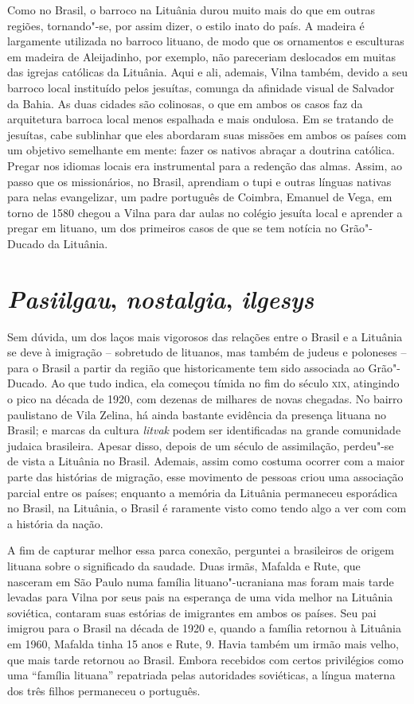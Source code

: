 Como no Brasil, o barroco na Lituânia durou muito mais do que em outras
regiões, tornando"-se, por assim dizer, o estilo inato do país. A madeira
é largamente utilizada no barroco lituano, de modo que os ornamentos e
esculturas em madeira de Aleijadinho, por exemplo, não pareceriam
deslocados em muitas das igrejas católicas da Lituânia. Aqui e ali,
ademais, Vilna também, devido a seu barroco local instituído pelos
jesuítas, comunga da afinidade visual de Salvador da Bahia. As duas
cidades são colinosas, o que em ambos os casos faz da arquitetura
barroca local menos espalhada e mais ondulosa. Em se tratando de
jesuítas, cabe sublinhar que eles abordaram suas missões em ambos os
países com um objetivo semelhante em mente: fazer os nativos abraçar a
doutrina católica. Pregar nos idiomas locais era instrumental para a
redenção das almas. Assim, ao passo que os missionários, no Brasil,
aprendiam o tupi e outras línguas nativas para nelas evangelizar, um
padre português de Coimbra, Emanuel de Vega, em torno de 1580 chegou a
Vilna para dar aulas no colégio jesuíta local e aprender a pregar em
lituano, um dos primeiros casos de que se tem notícia no Grão"-Ducado da
Lituânia.

\section*{\textit{Pasiilgau}, \textit{nostalgia}, \textit{ilgesys}}

Sem dúvida, um dos laços mais vigorosos das relações entre o Brasil e a
Lituânia se deve à imigração -- sobretudo de lituanos, mas também de
judeus e poloneses -- para o Brasil a partir da região que historicamente
tem sido associada ao Grão"-Ducado. Ao que tudo indica, ela começou
tímida no fim do século \textsc{xix}, atingindo o pico na década de 1920,
com dezenas de milhares de novas chegadas. No bairro paulistano de Vila
Zelina, há ainda bastante evidência da presença lituana no Brasil; e
marcas da cultura \textit{litvak} podem ser identificadas na grande comunidade
judaica brasileira. Apesar disso, depois de um século de assimilação,
perdeu"-se de vista a Lituânia no Brasil. Ademais, assim como costuma
ocorrer com a maior parte das histórias de migração, esse movimento de
pessoas criou uma associação parcial entre os países; enquanto a memória
da Lituânia permaneceu esporádica no Brasil, na Lituânia, o Brasil é
raramente visto como tendo algo a ver com com a história da nação.

A fim de capturar melhor essa parca conexão, perguntei a brasileiros de
origem lituana sobre o significado da saudade. Duas irmãs, Mafalda e
Rute, que nasceram em São Paulo numa família lituano"-ucraniana mas 
foram mais tarde levadas para Vilna por seus pais na esperança de uma
vida melhor na Lituânia soviética, contaram suas estórias de imigrantes
em ambos os países. Seu pai imigrou para o Brasil na década de 1920 e,
quando a família retornou à Lituânia em 1960, Mafalda tinha 15 anos e
Rute, 9. Havia também um irmão mais velho, que mais tarde retornou ao
Brasil. Embora recebidos com certos privilégios como uma ``família
lituana'' repatriada pelas autoridades soviéticas, a língua materna dos
três filhos permaneceu o português. 

